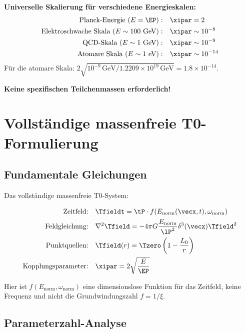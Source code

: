 	\textbf{Universelle Skalierung für verschiedene Energieskalen:}
	\begin{align}
		\text{Planck-Energie } (E = \EP): \quad &\xipar = 2 \\
		\text{Elektroschwache Skala } (E \sim 100 \text{ GeV}): \quad &\xipar \sim 10^{-8} \\
		\text{QCD-Skala } (E \sim 1 \text{ GeV}): \quad &\xipar \sim 10^{-9} \\
		\text{Atomare Skala } (E \sim 1 \text{ eV}): \quad &\xipar \sim 10^{-14}
	\end{align}
	Für die atomare Skala: $2\sqrt{10^{-9}\,\text{GeV}/1.2209\times10^{19}\,\text{GeV}}=1.8\times10^{-14}$.
	
	\textbf{Keine spezifischen Teilchenmassen erforderlich!}
	
	\section{Vollständige massenfreie T0-Formulierung}
	\label{sec:complete_formulation}
	
	\subsection{Fundamentale Gleichungen}
	\label{subsec:fundamental_equations}
	
	Das vollständige massenfreie T0-System:
	
	\begin{tcolorbox}[colback=blue!5!white,colframe=blue!75!black,title=Massenfreies T0-Modell]
		\begin{align}
			\text{Zeitfeld:} \quad &\Tfieldt = \tP \cdot f(E_{\text{norm}}(\vecx,t), \omega_{\text{norm}}) \\
			\text{Feldgleichung:} \quad &\nabla^2 \Tfield = -4\pi G \frac{E_{\text{norm}}}{\lP^2} \delta^3(\vecx) \Tfield^2 \\
			\text{Punktquellen:} \quad &\Tfield(r) = \Tzero\left(1 - \frac{L_0}{r}\right) \\
			\text{Kopplungsparameter:} \quad &\xipar = 2\sqrt{\frac{E}{\EP}}
		\end{align}
	\end{tcolorbox}

Hier ist $f(E_{\text{norm}}, \omega_{\text{norm}})$ eine dimensionslose Funktion für das Zeitfeld, keine Frequenz und nicht die Grundwindungszahl $f = 1/\xi$.

	\subsection{Parameterzahl-Analyse}
	\label{subsec:parameter_count}
	
